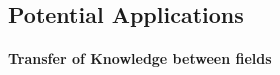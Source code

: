 \documentclass[fleqn,10pt]{wlscirep}
\begin{document}



\subsection*{Potential Applications}


\paragraph{Transfer of Knowledge between fields}









\newpage


















%









\end{document}
